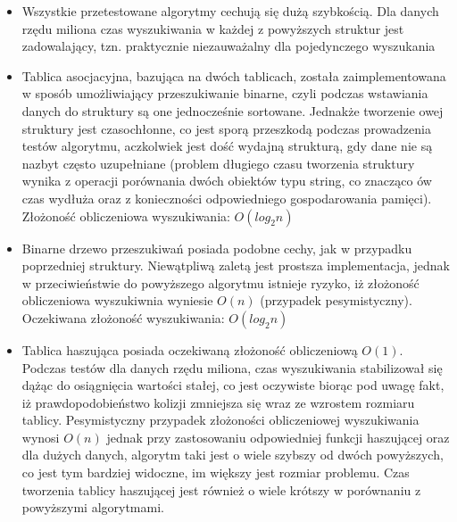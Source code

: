 \documentclass[a4paper,11pt]{article}
\begin{document}
\begin{itemize}
\item Wszystkie przetestowane algorytmy cechują się dużą szybkością. Dla danych rzędu miliona czas wyszukiwania w każdej z powyższych struktur jest zadowalający, tzn. praktycznie 
niezauważalny dla pojedynczego wyszukania

\item Tablica asocjacyjna, bazująca na dwóch tablicach, została zaimplementowana w sposób umożliwiający przeszukiwanie binarne, czyli podczas wstawiania danych do
struktury są one jednocześnie sortowane. Jednakże tworzenie owej struktury jest czasochłonne, co jest sporą przeszkodą podczas prowadzenia testów
algorytmu, aczkolwiek jest dość wydajną strukturą, gdy dane nie są nazbyt często uzupełniane (problem długiego czasu tworzenia struktury wynika z
operacji porównania dwóch obiektów typu string, co znacząco ów czas wydłuża oraz z konieczności odpowiedniego gospodarowania pamięci). Złożoność obliczeniowa wyszukiwania: $ O(log_{2}n) $
\item Binarne drzewo przeszukiwań posiada podobne cechy, jak w przypadku poprzedniej struktury. Niewątpliwą zaletą jest prostsza implementacja, jednak w przeciwieństwie do powyższego algorytmu
istnieje ryzyko, iż złożoność obliczeniowa wyszukiwnia wyniesie $ O(n) $ (przypadek pesymistyczny). Oczekiwana złożoność wyszukiwania: $ O(log_{2}n) $
\item Tablica haszująca posiada oczekiwaną złożoność obliczeniową $ O(1) $. Podczas testów dla danych rzędu miliona, czas wyszukiwania stabilizował się dążąc do osiągnięcia wartości stałej, 
co jest oczywiste biorąc pod uwagę fakt, iż prawdopodobieństwo kolizji zmniejsza się wraz ze wzrostem rozmiaru tablicy. Pesymistyczny przypadek złożoności obliczeniowej wyszukiwania wynosi
$ O(n) $ jednak przy zastosowaniu odpowiedniej funkcji haszującej oraz dla dużych danych, algorytm taki jest o wiele szybszy od dwóch powyższych, co jest tym bardziej
widoczne, im większy jest rozmiar problemu. Czas tworzenia tablicy haszującej jest również o wiele krótszy w porównaniu z powyższymi algorytmami.
\end{itemize}
\end{document}
